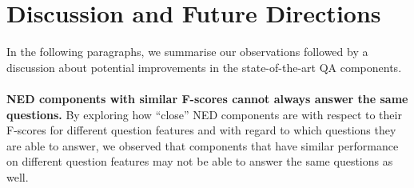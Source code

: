 \documentclass[sigconf,edbt]{acmart-edbt2019}
\begin{document}
\section{Discussion and Future Directions} \label{sec:discussion}
In the following paragraphs, we summarise our observations followed by a discussion about potential improvements in the state-of-the-art QA components.
~\\
\textbf{NED components with similar F-scores cannot always answer the same questions.} By exploring how ``close'' NED components are with respect to their F-scores for different question features and with regard to which questions they are able to answer, we observed that components that have similar performance on different question features may not be able to answer the same questions as well.
\end{document}
